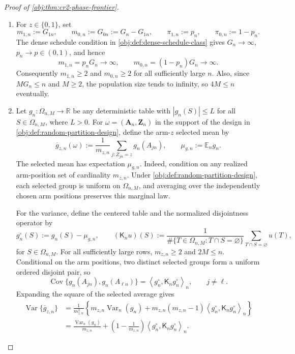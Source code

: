 \begin{proof}[Proof of \cref{obj:thm:cr2-phase-frontier}]
\begin{enumerate}
\item For \(z\in\{0,1\}\), set
\[
m_{1,n}:=G_{1n},\qquad m_{0,n}:=G_{0n}:=G_n-G_{1n},
\qquad
\pi_{1,n}:=p_n,\qquad \pi_{0,n}:=1-p_n .
\]
The dense schedule condition in \cref{obj:def:dense-schedule-class} gives \(G_n\to\infty\), \(p_n\to p\in(0,1)\), and hence
\[
m_{1,n}=p_nG_n\to\infty,
\qquad
m_{0,n}=(1-p_n)G_n\to\infty .
\]
Consequently \(m_{1,n}\ge2\) and \(m_{0,n}\ge2\) for all sufficiently large \(n\). Also, since \(MG_n\le n\) and \(M\ge2\), the population size tends to infinity, so \(4M\le n\) eventually. %

\item Let \(g_n:\Omega_{n,M}\to\mathbb R\) be any deterministic table with \(|g_n(S)|\le L\) for all \(S\in\Omega_{n,M}\), where \(L>0\). For \(\omega=(\mathbf A_n,\mathbf Z_n)\) in the support of the design in \cref{obj:def:random-partition-design}, define the arm-\(z\) selected mean by
\[
\overline g_{z,n}(\omega)
:=
\frac{1}{m_{z,n}}\sum_{j:Z_{jn}=z} g_n(A_{jn}),
\qquad
\mu_{g,n}:=\mathbb E_n g_n .
\]
The selected mean has expectation \(\mu_{g,n}\). Indeed, condition on any realized arm-position set of cardinality \(m_{z,n}\). Under \cref{obj:def:random-partition-design}, each selected group is uniform on \(\Omega_{n,M}\), and averaging over the independently chosen arm positions preserves this marginal law.

For the variance, define the centered table and the normalized disjointness operator by
\[
g_{n}^{\circ}(S):=g_n(S)-\mu_{g,n},
\qquad
(\mathsf K_n u)(S)
:=
\frac{1}{\#\{T\in\Omega_{n,M}:T\cap S=\varnothing\}}
\sum_{T\cap S=\varnothing}u(T),
\]
for \(S\in\Omega_{n,M}\). For all sufficiently large rows, \(m_{z,n}\ge2\) and \(2M\le n\). Conditional on the arm positions, two distinct selected groups form a uniform ordered disjoint pair, so
\[
\operatorname{Cov}\{g_n(A_{jn}),g_n(A_{\ell n})\}
=
\left\langle g_{n}^{\circ},\mathsf K_n g_{n}^{\circ}\right\rangle_n,
\qquad j\ne\ell .
\]
Expanding the square of the selected average gives
\[
\begin{aligned}
\operatorname{Var}\{\overline g_{z,n}\}
&=
\frac{1}{m_{z,n}^2}
\left\{
 m_{z,n}\operatorname{Var}_n(g_n)
 +m_{z,n}(m_{z,n}-1)
 \left\langle g_{n}^{\circ},\mathsf K_n g_{n}^{\circ}\right\rangle_n
\right\} \\
&=
\frac{\operatorname{Var}_n(g_n)}{m_{z,n}}
+
\left(1-\frac{1}{m_{z,n}}\right)
\left\langle g_{n}^{\circ},\mathsf K_n g_{n}^{\circ}\right\rangle_n .
\end{aligned}
\]


\end{enumerate}
\end{proof}
